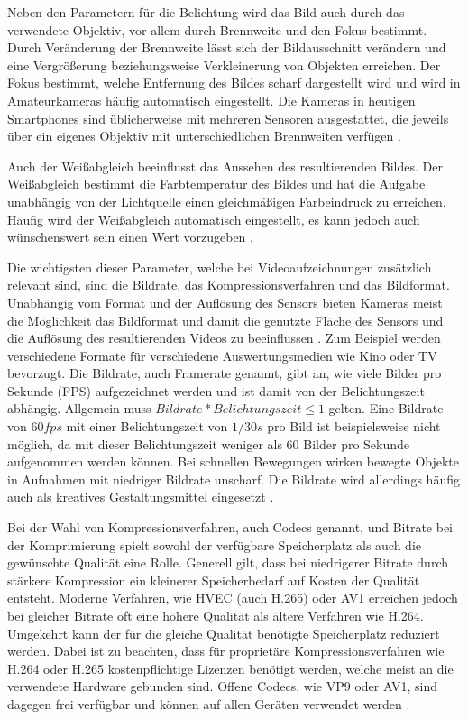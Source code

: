 Neben den Parametern für die Belichtung wird das Bild auch durch das verwendete Objektiv, vor allem durch Brennweite und den Fokus bestimmt.
Durch Veränderung der Brennweite lässt sich der Bildausschnitt verändern und eine Vergrößerung beziehungsweise Verkleinerung von Objekten erreichen.
Der Fokus bestimmt, welche Entfernung des Bildes scharf dargestellt wird und wird in Amateurkameras häufig automatisch eingestellt.
Die Kameras in heutigen Smartphones sind üblicherweise mit mehreren Sensoren ausgestattet, die jeweils über ein eigenes Objektiv mit unterschiedlichen Brennweiten verfügen \cite[S. 499ff.]{Schmidt_Videotechnik}.

Auch der Weißabgleich beeinflusst das Aussehen des resultierenden Bildes.
Der Weißabgleich bestimmt die Farbtemperatur des Bildes und hat die Aufgabe unabhängig von der Lichtquelle einen gleichmäßigen Farbeindruck zu erreichen.
Häufig wird der Weißabgleich automatisch eingestellt, es kann jedoch auch wünschenswert sein einen Wert vorzugeben \cite[S. 434ff.]{Schmidt_Videotechnik}.

Die wichtigsten dieser Parameter, welche bei Videoaufzeichnungen zusätzlich relevant sind, sind die Bildrate, das Kompressionsverfahren und das Bildformat.
Unabhängig vom Format und der Auflösung des Sensors bieten Kameras meist die Möglichkeit das Bildformat und damit die genutzte Fläche des Sensors und die Auflösung des resultierenden Videos zu beeinflussen \cite[S. 422]{Schmidt_Videotechnik}.
Zum Beispiel werden verschiedene Formate für verschiedene Auswertungsmedien wie Kino oder TV bevorzugt.
Die Bildrate, auch Framerate genannt, gibt an, wie viele Bilder pro Sekunde (\ac{FPS}) aufgezeichnet werden und ist damit von der Belichtungszeit abhängig.
Allgemein muss $Bildrate * Belichtungszeit \leq 1$ gelten.
Eine Bildrate von $60 fps$ mit einer Belichtungszeit von $1/30 s$ pro Bild ist beispielsweise nicht möglich, da mit dieser Belichtungszeit weniger als 60 Bilder pro Sekunde aufgenommen werden können.
Bei schnellen Bewegungen wirken bewegte Objekte in Aufnahmen mit niedriger Bildrate unscharf.
Die Bildrate wird allerdings häufig auch als kreatives Gestaltungsmittel eingesetzt \cite[S. 174f.]{Schmidt_Videotechnik}.

Bei der Wahl von Kompressionsverfahren, auch Codecs genannt, und Bitrate bei der Komprimierung spielt sowohl der verfügbare Speicherplatz als auch die gewünschte Qualität eine Rolle.
Generell gilt, dass bei niedrigerer Bitrate durch stärkere Kompression ein kleinerer Speicherbedarf auf Kosten der Qualität entsteht.
Moderne Verfahren, wie \ac{HVEC} (auch H.265)  oder AV1 erreichen jedoch bei gleicher Bitrate oft eine höhere Qualität als ältere Verfahren wie H.264.
Umgekehrt kann der für die gleiche Qualität benötigte Speicherplatz reduziert werden.
Dabei ist zu beachten, dass für proprietäre Kompressionsverfahren wie H.264 oder H.265 kostenpflichtige Lizenzen benötigt werden, welche meist an die verwendete Hardware gebunden sind.
Offene Codecs, wie VP9 oder AV1, sind dagegen frei verfügbar und können auf allen Geräten verwendet werden \cite[S. 253ff.]{Schmidt_Videotechnik}.


